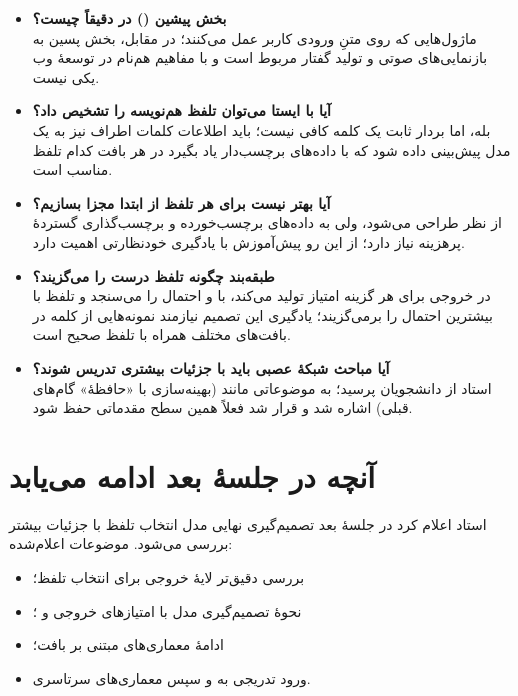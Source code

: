 \begin{itemize}
  \item \textbf{بخش پیشین () در  دقیقاً چیست؟}\\ ماژول‌هایی که روی متنِ ورودی کاربر عمل می‌کنند؛ در مقابل، بخش پسین به بازنمایی‌های صوتی و تولید گفتار مربوط است و با مفاهیم هم‌نام در توسعهٔ وب یکی نیست.
  \item \textbf{آیا با  ایستا می‌توان تلفظ هم‌نویسه را تشخیص داد؟}\\ بله، اما بردار ثابت یک کلمه کافی نیست؛ باید اطلاعات کلمات اطراف نیز به یک مدل پیش‌بینی داده شود که با داده‌های برچسب‌دار یاد بگیرد در هر بافت کدام تلفظ مناسب است.
  \item \textbf{آیا بهتر نیست برای هر تلفظ از ابتدا  مجزا بسازیم؟}\\ از نظر طراحی می‌شود، ولی به داده‌های برچسب‌خورده و برچسب‌گذاری گستردهٔ پرهزینه نیاز دارد؛ از این رو پیش‌آموزش با یادگیری خودنظارتی اهمیت دارد.
  \item \textbf{طبقه‌بند چگونه تلفظ درست را می‌گزیند؟}\\ در خروجی برای هر گزینه امتیاز تولید می‌کند، با  و  احتمال را می‌سنجد و تلفظ با بیشترین احتمال را برمی‌گزیند؛ یادگیری این تصمیم نیازمند نمونه‌هایی از کلمه در بافت‌های مختلف همراه با تلفظ صحیح است.
  \item \textbf{آیا مباحث شبکهٔ عصبی باید با جزئیات بیشتری تدریس شوند؟}\\ استاد از دانشجویان پرسید؛ به موضوعاتی مانند  (بهینه‌سازی با «حافظهٔ» گام‌های قبلی) اشاره شد و قرار شد فعلاً همین سطح مقدماتی حفظ شود.
\end{itemize}

\section{آنچه در جلسهٔ بعد ادامه می‌یابد}

استاد اعلام کرد در جلسهٔ بعد تصمیم‌گیری نهایی مدل انتخاب تلفظ با جزئیات بیشتر بررسی می‌شود. موضوعات اعلام‌شده:
\begin{itemize}
  \item بررسی دقیق‌تر لایهٔ خروجی برای انتخاب تلفظ؛
  \item نحوهٔ تصمیم‌گیری مدل با امتیازهای خروجی و ؛
  \item ادامهٔ معماری‌های مبتنی بر بافت؛
  \item ورود تدریجی به  و سپس معماری‌های سرتاسری.
\end{itemize}

